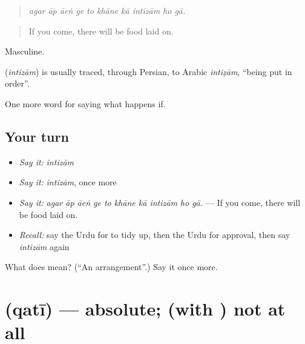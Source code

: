 \begin{quote}
         
\end{quote}

\begin{quote}
\emph{agar āp āeṅ ge to khāne kā intizām ho gā.}
\end{quote}

\begin{quote}
If you come, there will be food laid on.
\end{quote}

Masculine.

\begin{cousinweb}
\textbf{} (\emph{intizām}) is usually traced, through Persian, to Arabic \emph{intiẓām}, \textquotedblleft{}being put in order\textquotedblright{}.
\end{cousinweb}

\begin{grammarlens}[title={What you've built}]
One more word for saying what happens if.
\end{grammarlens}

\subsection*{Your turn}
\begin{itemize}
\raggedright
  \item \emph{Say it:} \emph{intizām}
  \item \emph{Say it:} \emph{intizām}, once more
  \item \emph{Say it:} \emph{agar āp āeṅ ge to khāne kā intizām ho gā.} — If you come, there will be food laid on.
  \item \emph{Recall:} say the Urdu for to tidy up, then the Urdu for approval, then say \emph{intizām} again
\end{itemize}

\begin{tcolorbox}[breakable,colback=teal!4,colframe=teal!35!black,title={Before you move on}]
What does  mean? (\textquotedblleft{}An arrangement\textquotedblright{}.) Say it once more.
\end{tcolorbox}
\section[\texorpdfstring{\ur{قطعی} (qatī)}{قطعی (qatī)}]{ (qatī) — absolute; (with ) not at all}

